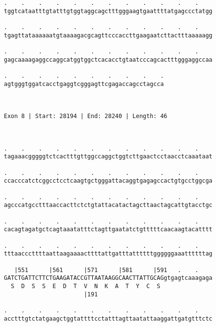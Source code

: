 \documentclass{article}
\begin{document}
\begin{Verbatim}
.    .    .    .    .    .    .    .    .    .    .    .    
tggtcataatttgtatttgtggtaggcagctttgggaagtgaattttatgagccctatgg
                                                            
.    .    .    .    .    .    .    .    .    .    .    .    
tgagttataaaaaatgtaaaagacgcagttcccaccttgaagaatcttactttaaaaagg
                                                            
.    .    .    .    .    .    .    .    .    .    .    .    
gagcaaaagaggccaggcatggtggctcacacctgtaatcccagcactttgggaggccaa
                                                            
.    .    .    .    .    .    .    .    .    .
agtgggtggatcacctgaggtcgggagttcgagaccagcctagcca
                                              
                                              
 
Exon 8 | Start: 28194 | End: 28240 | Length: 46



.    .    .    .    .    .    .    .    .    .    .    .    
tagaaacgggggtctcactttgttggccaggctggtcttgaactcctaacctcaaataat
                                                            
.    .    .    .    .    .    .    .    .    .    .    .    
ccacccatctcggcctcctcaagtgctgggattacaggtgagagccactgtgcctggcga
                                                            
.    .    .    .    .    .    .    .    .    .    .    .    
agcccatgcctttaaccacttctctgtattacatactagcttaactagcattgtacctgc
                                                            
.    .    .    .    .    .    .    .    .    .    .    .    
cacagtagatgctcagtaaatatttctagttgaatatctgtttttcaacaagtacatttt
                                                            
.    .    .    .    .    .    .    .    .    .    .    .    
tttaacccttttaattaagaaaacttttattgatttattttttggggggaaattttttag
                                                            
   |551      |561      |571      |581      |591   .    .    
GATCTGATTCTTCTGAAGATACCGTTAATAAGGCAACTTATTGCAGgtgagtcaaagaga
  S  D  S  S  E  D  T  V  N  K  A  T  Y  C  S               
                       |191                                 
  
.    .    .    .    .    .    .    .    .    .    .    .    
acctttgtctatgaagctggtattttcctatttagttaatattaaggattgatgtttctc
                                                            

\end{Verbatim}
\end{document}
